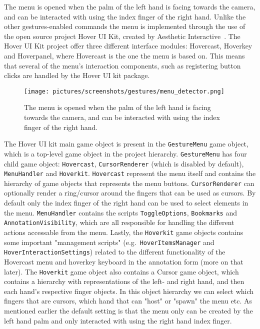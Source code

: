 The menu is opened when the palm of the left hand is facing towards the camera, and can be interacted with using the index finger of the right hand.
Unlike the other gestures-enabled commands the menu is implemented through the use of the open source project Hover UI Kit, created by Aesthetic Interactive~\citep{Hoverkit}.
The Hover UI Kit project offer three different interface modules: Hovercast, Hoverkey and Hoverpanel, where Hovercast is the one the menu is based on.
This means that several of the menu's interaction components, such as registering button clicks are handled by the Hover UI kit package.

\begin{figure}%
	\texttt{[image: pictures/screenshots/gestures/menu\_detector.png]}
	\caption[The Menu]{The menu is opened when the palm of the left hand is facing towards the camera, and can be interacted with using the index finger of the right hand.}
	\label{fig:menu_detector}
\end{figure} 

The Hover UI kit main game object is present in the \texttt{GestureMenu} game object, which is a top-level game object in the project hierarchy.
\texttt{GestureMenu} has four child game object: \texttt{Hovercast}, \texttt{CursorRenderer} (which is disabled by default), \texttt{MenuHandler} and \texttt{Hoverkit}.
\texttt{Hovercast} represent the menu itself and contains the hierarchy of game objects that represents the menu buttons. 
\texttt{CursorRenderer} can optionally render a ring/cursor around the fingers that can be used as cursors.
By default only the index finger of the right hand can be used to select elements in the menu.
\texttt{MenuHandler} contains the scripts \texttt{ToggleOptions}, \texttt{Bookmarks} and \texttt{AnnotationVisibility}, which are all responsible for handling
the different actions accessable from the menu.
Lastly, the \texttt{Hoverkit} game objects contains some important "management scripts" (e.g.~\texttt{HoverItemsManager} and \texttt{HoverInteractionSettings}) related to the 
different functionality of the Hovercast menu and hoverkey keyboard in the annotation form (more on that later). The \texttt{Hoverkit} game object also
contains a Cursor game object, which contains a hierarchy with representations of the left- and right hand, and then each hand's respective finger objects. 
In this object hierarchy we can select which fingers that are cursors, which hand that can "host" or "spawn" the menu etc. As mentioned earlier
the default setting is that the menu only can be created by the left hand palm and only interacted with using the right hand index finger. 
 
